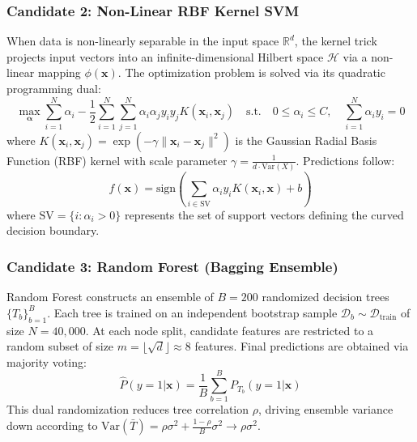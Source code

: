 \documentclass[11pt,a4paper]{article}
\begin{document}
\subsubsection{Candidate 2: Non-Linear RBF Kernel SVM}
When data is non-linearly separable in the input space $\mathbb{R}^d$, the kernel trick projects input vectors into an infinite-dimensional Hilbert space $\mathcal{H}$ via a non-linear mapping $\phi(\mathbf{x})$. The optimization problem is solved via its quadratic programming dual:
\begin{equation}
    \max_{\boldsymbol{\alpha}} \sum_{i=1}^N \alpha_i - \frac{1}{2} \sum_{i=1}^N \sum_{j=1}^N \alpha_i \alpha_j y_i y_j K(\mathbf{x}_i, \mathbf{x}_j) \quad \text{s.t.} \quad 0 \le \alpha_i \le C, \quad \sum_{i=1}^N \alpha_i y_i = 0
\end{equation}
where $K(\mathbf{x}_i, \mathbf{x}_j) = \exp(-\gamma \|\mathbf{x}_i - \mathbf{x}_j\|^2)$ is the Gaussian Radial Basis Function (RBF) kernel with scale parameter $\gamma = \frac{1}{d \cdot \text{Var}(X)}$. Predictions follow:
\begin{equation}
    f(\mathbf{x}) = \text{sign}\left(\sum_{i \in \text{SV}} \alpha_i y_i K(\mathbf{x}_i, \mathbf{x}) + b\right)
\end{equation}
where $\text{SV} = \{i : \alpha_i > 0\}$ represents the set of support vectors defining the curved decision boundary.

\subsubsection{Candidate 3: Random Forest (Bagging Ensemble)}
Random Forest constructs an ensemble of $B=200$ randomized decision trees $\{T_b\}_{b=1}^B$. Each tree is trained on an independent bootstrap sample $\mathcal{D}_b \sim \mathcal{D}_{\text{train}}$ of size $N=40,000$. At each node split, candidate features are restricted to a random subset of size $m = \lfloor\sqrt{d}\rfloor \approx 8$ features. Final predictions are obtained via majority voting:
\begin{equation}
    \hat{P}(y=1|\mathbf{x}) = \frac{1}{B} \sum_{b=1}^B P_{T_b}(y=1|\mathbf{x})
\end{equation}
This dual randomization reduces tree correlation $\rho$, driving ensemble variance down according to $\text{Var}(\bar{T}) = \rho \sigma^2 + \frac{1-\rho}{B}\sigma^2 \to \rho \sigma^2$.
\end{document}

